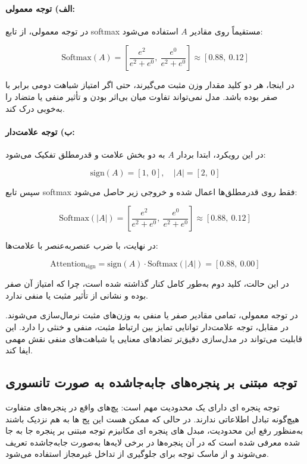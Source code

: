 \paragraph{الف) توجه معمولی:}

در توجه معمولی، از تابع softmax مستقیماً روی مقادیر $A$ استفاده می‌شود:

\[
\text{Softmax}(A) =
\left[
\frac{e^2}{e^2 + e^0},\ 
\frac{e^0}{e^2 + e^0}
\right]
\approx [0.88,\ 0.12]
\]

در اینجا، هر دو کلید مقدار وزن مثبت می‌گیرند، حتی اگر امتیاز شباهت دومی برابر با صفر بوده باشد. مدل نمی‌تواند تفاوت میان بی‌اثر بودن و تأثیر منفی یا متضاد را به‌خوبی درک کند.

\paragraph{ب) توجه علامت‌دار:}

در این رویکرد، ابتدا بردار $A$ به دو بخش علامت و قدرمطلق تفکیک می‌شود:

\[
\text{sign}(A) = [1,\ 0], \quad
|A| = [2,\ 0]
\]

سپس تابع softmax فقط روی قدرمطلق‌ها اعمال شده و خروجی زیر حاصل می‌شود:

\[
\text{Softmax}(|A|) = 
\left[
\frac{e^2}{e^2 + e^0},\ 
\frac{e^0}{e^2 + e^0}
\right]
\approx [0.88,\ 0.12]
\]

در نهایت، با ضرب عنصر‌به‌عنصر با علامت‌ها:

\[
\text{Attention}_{\text{sign}} = 
\text{sign}(A) \cdot \text{Softmax}(|A|) = [0.88,\ 0.00]
\]

در این حالت، کلید دوم به‌طور کامل کنار گذاشته شده است، چرا که امتیاز آن صفر بوده و نشانی از تأثیر مثبت یا منفی ندارد.


در توجه معمولی، تمامی مقادیر صفر یا منفی به وزن‌های مثبت نرمال‌سازی می‌شوند. در مقابل، توجه علامت‌دار توانایی تمایز بین ارتباط مثبت، منفی و خنثی را دارد. این قابلیت می‌تواند در مدل‌سازی دقیق‌تر تضادهای معنایی یا شباهت‌های منفی نقش مهمی ایفا کند.


\subsection{توجه مبتنی بر پنجره‌های جابه‌جا‌شده به صورت تانسوری}



توجه پنجره ای دارای یک محدودیت مهم است: پچ‌های واقع در پنجره‌های متفاوت هیچ‌گونه تبادل اطلاعاتی ندارند.
در حالی که ممکن هست این پج ها به هم نزدیک باشند به‌منظور رفع این محدودیت، مبدل های پنجره ای مکانیزم توجه مبتنی بر پنجره جا به جا شده معرفی شده است که در آن پنجره‌ها در برخی لایه‌ها به‌صورت جابه‌جا‌شده تعریف می‌شوند و از ماسک توجه برای جلوگیری از تداخل غیرمجاز استفاده می‌شود.

